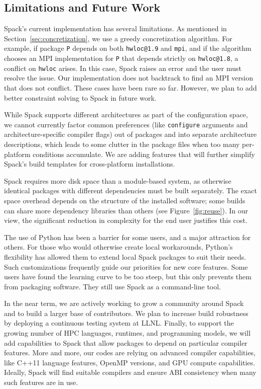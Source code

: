 
\subsection{Limitations and Future Work}

Spack's current implementation has several limitations.
As mentioned in Section~\ref{sec:concretization}, we use a greedy 
concretization algorithm. For example, if package {\tt P} depends on 
both {\tt hwloc@1.9} and {\tt mpi}, and if the algorithm
chooses an MPI implementation for {\tt P} that depends strictly on
{\tt hwloc@1.8}, a conflict on {\tt hwloc} arises. In this case, Spack 
raises an error and the user must resolve the issue. Our implementation 
does not backtrack to find an MPI version that does not conflict. These 
cases have been rare so far. However, we plan to add better constraint
solving to Spack in future work.

While Spack supports different architectures as part of the 
configuration space, we cannot currently factor common preferences (like 
{\tt configure} arguments and architecture-specific compiler flags) out of 
packages and into separate architecture descriptions, which leads to some 
clutter in the package files when too many per-platform conditions accumulate.
We are adding features that will further simplify Spack's build templates
for cross-platform installations.

Spack requires more disk space than a module-based system, as otherwise 
identical packages with different dependencies must be built separately. 
The exact space overhead depends on the structure of the installed
software; some builds can share more dependency libraries than others
(see Figure~\ref{fig:reuse}).
In our view, the significant reduction in complexity for the end user
justifies this cost.

The use of Python has been a barrier for some users, and
a major attraction for others. For those who would otherwise create local
workarounds, Python's flexibility has allowed them to extend local
Spack packages to suit their needs. Such customizations frequently
guide our priorities for new core features. Some users have found the 
learning curve to be too steep, but this only prevents them from 
packaging software. They still use Spack as a command-line tool.

In the near term, we are actively working to grow a community around Spack 
and to build a larger base of contributors. We plan to
increase build robustness by deploying a continuous testing system
at LLNL.  Finally, to support the growing number of
HPC languages, runtimes, and programming models, we will add
capabilities to Spack that allow packages to depend on particular
compiler features.  More and more, our codes are relying
on advanced compiler capabilities, like C++11 language features,
OpenMP versions, and GPU compute capabilities. Ideally, Spack
will find suitable compilers and ensure ABI consistency when many
such features are in use.
